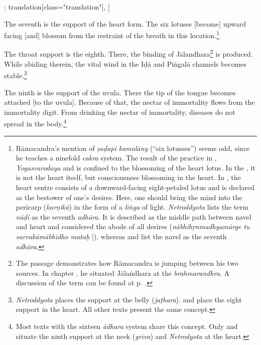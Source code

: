 \begin{alignment}[
  texts=edition[class="edition"];
  translation[class="translation"],
  ]
\begin{translation}
\begin{tlate}[p30_03]
     The seventh is the support of the heart form. The six lotuses [become] upward facing [and] blossom from the restraint of the breath in this location.\footnote{Rāmacandra's mention of \textit{ṣaḍapi kamalāny} (``six lotusses'') seems odd, since he teaches a ninefold \textit{cakra} system. The result of the practice in , \textit{Yogasvarodaya} and  is confined to the blossoming of the heart lotus. In the , it is not the heart itself, but consciousness blossoming in the heart. In , the heart centre consists of a downward-facing eight-petaled lotus and is declared as the bestower of one's desires. Here, one should bring the mind into the pericarp (\textit{karṇikā}) in the form of a \textit{liṅga} of light. \textit{Netroddyota} lists the term \textit{nāḍi} as the seventh \textit{adhāra}. It is described as the middle path between navel and heart and considered the abode of all desires (\textit{nābhihṛnmadhyamārge tu sarvakāmābhidho mataḥ} |), whereas  and  list the navel as the seventh \textit{adhāra}.}

      The throat support is the eighth. There, the binding of Jālandhara\footnote{The passage demonstrates how Rāmacandra is jumping between his two sources. In chapter , he situated Jālaṅdhara at the \textit{brahmarandhra}. A discussion of the term can be found at p. \pageref{cakra8trans}.} is produced. While abiding therein, the vital wind in the Iḍā and Piṅgalā channels becomes stable.\footnote{\textit{Netroddyota} places the support at the belly (\textit{jaṭhara}).  and  place the eight support in the heart. All other texts present the same concept.}

      The ninth is the support of the uvula. There the tip of the tongue becomes attached [to the uvula]. Because of that, the nectar of immortality flows from the immortality digit. From drinking the nectar of immortality, diseases do not spread in the body.\footnote{Most texts with the sixteen \textit{ādhara} system share this concept. Only  and  situate the ninth support at the neck (\textit{grīva}) and \textit{Netrodyota} at the heart.}      
     \flushpage
     \end{tlate}
  \end{translation}
\end{alignment}
\pagebreak %
